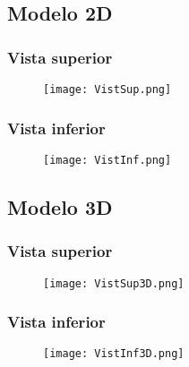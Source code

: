  






\subsection{Modelo 2D}
\subsubsection{Vista superior}
\begin{figure}[H]
	\centering
	\texttt{[image: VistSup.png]}
	\label{fig:VistSup}
\end{figure}

\subsubsection{Vista inferior}
\begin{figure}[H]
	\centering
	\texttt{[image: VistInf.png]}
	\label{fig:VistInf}
\end{figure}

\subsection{Modelo 3D}
\subsubsection{Vista superior}
\begin{figure}[H]
	\centering
	\texttt{[image: VistSup3D.png]}
	\label{fig:VistSup3D}
\end{figure}

\subsubsection{Vista inferior}
\begin{figure}[H]
	\centering
	\texttt{[image: VistInf3D.png]}
	\label{fig:VistInf3D}
\end{figure}

